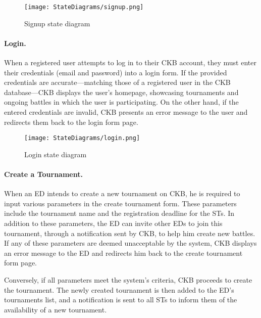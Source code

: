 \begin{figure}[H]
    \begin{center}
        \texttt{[image: StateDiagrams/signup.png]}
        \caption{Signup state diagram}
        \label{fig:signup_sd}%
    \end{center}
\end{figure}

\paragraph{Login.}
When a registered user attempts to log in to their CKB account, they must enter their credentials (email and password) into a login form. If the provided credentials are accurate—matching those of a registered user in the CKB database—CKB displays the user's homepage, showcasing tournaments and ongoing battles in which the user is participating. On the other hand, if the entered credentials are invalid, CKB presents an error message to the user and redirects them back to the login form page.

\begin{figure}[H]
    \begin{center}
        \texttt{[image: StateDiagrams/login.png]}
        \caption{Login state diagram}
        \label{fig:login_sd}%
    \end{center}
\end{figure}

\paragraph{Create a Tournament.}
When an ED intends to create a new tournament on CKB, he is required to input various parameters in the create tournament form. These parameters include the tournament name and the registration deadline for the STs. In addition to these parameters, the ED can invite other EDs to join this tournament, through a notification sent by CKB, to help him create new battles. If any of these parameters are deemed unacceptable by the system, CKB displays an error message to the ED and redirects him back to the create tournament form page.

Conversely, if all parameters meet the system's criteria, CKB proceeds to create the tournament. The newly created tournament is then added to the ED's tournaments list, and a notification is sent to all STs to inform them of the availability of a new tournament.

